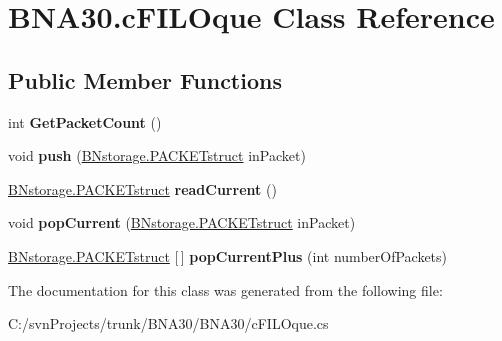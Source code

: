 \hypertarget{class_b_n_a30_1_1c_f_i_l_oque}{}\section{B\+N\+A30.\+c\+F\+I\+L\+Oque Class Reference}
\label{class_b_n_a30_1_1c_f_i_l_oque}
\subsection*{Public Member Functions}
\begin{DoxyCompactItemize}
\item 
\mbox{\label{class_b_n_a30_1_1c_f_i_l_oque_a8624e60aa5f612a69e02d38e3441febb}} 
int {\bfseries Get\+Packet\+Count} ()
\item 
\mbox{\label{class_b_n_a30_1_1c_f_i_l_oque_a9be0c1afb25b931f86c9e2bc0e29e325}} 
void {\bfseries push} (\mbox{\hyperlink{struct_b_n_a30_1_1_b_nstorage_1_1_p_a_c_k_e_tstruct}{B\+Nstorage.\+P\+A\+C\+K\+E\+Tstruct}} in\+Packet)
\item 
\mbox{\label{class_b_n_a30_1_1c_f_i_l_oque_ad096dc42d61a2f27a1bfc95b8c3ed74c}} 
\mbox{\hyperlink{struct_b_n_a30_1_1_b_nstorage_1_1_p_a_c_k_e_tstruct}{B\+Nstorage.\+P\+A\+C\+K\+E\+Tstruct}} {\bfseries read\+Current} ()
\item 
\mbox{\label{class_b_n_a30_1_1c_f_i_l_oque_af0a4c528a2ed727e6024c187194e136d}} 
void {\bfseries pop\+Current} (\mbox{\hyperlink{struct_b_n_a30_1_1_b_nstorage_1_1_p_a_c_k_e_tstruct}{B\+Nstorage.\+P\+A\+C\+K\+E\+Tstruct}} in\+Packet)
\item 
\mbox{\label{class_b_n_a30_1_1c_f_i_l_oque_a817c902ee79eea8aef4da6ed42f6704e}} 
\mbox{\hyperlink{struct_b_n_a30_1_1_b_nstorage_1_1_p_a_c_k_e_tstruct}{B\+Nstorage.\+P\+A\+C\+K\+E\+Tstruct}} \mbox{[}$\,$\mbox{]} {\bfseries pop\+Current\+Plus} (int number\+Of\+Packets)
\end{DoxyCompactItemize}


The documentation for this class was generated from the following file\+:\begin{DoxyCompactItemize}
\item 
C\+:/svn\+Projects/trunk/\+B\+N\+A30/\+B\+N\+A30/c\+F\+I\+L\+Oque.\+cs\end{DoxyCompactItemize}
